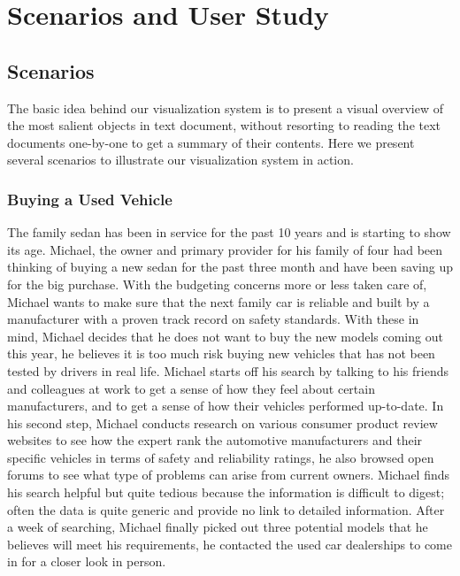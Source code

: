 
\chapter{Scenarios and User Study}

\section{Scenarios}
The basic idea behind our visualization system is to present a visual overview
of the most salient objects in text document, without resorting to reading the
text documents one-by-one to get a summary of their contents. Here we present
several scenarios to illustrate our visualization system in action.

\subsection{Buying a Used Vehicle}
The family sedan has been in service for the past 10 years and is starting to
show its age. Michael, the owner and primary provider for his family of four had 
been thinking of buying a new sedan for the past three month and have been saving 
up for the big purchase. With the budgeting concerns more or less taken care of, 
Michael wants to make sure that the next family car is reliable and built by a 
manufacturer with a proven track record on safety standards. With these in mind, 
Michael decides that he does not want to buy the new models coming out this year, 
he believes it is too much risk buying new vehicles that has not been tested by 
drivers in real life. Michael starts off his search by talking to his friends and 
colleagues at work to get a sense of how they feel about certain manufacturers, 
and to get a sense of how their vehicles performed up-to-date. In his second step, 
Michael conducts research on various consumer product review websites to see how 
the expert rank the automotive manufacturers and their specific vehicles in terms 
of safety and reliability ratings, he also browsed open forums to see what type of 
problems can arise from current owners. Michael finds his search helpful but quite 
tedious because the information is difficult to digest; often the data is quite 
generic and provide no link to detailed information. After a week of searching, 
Michael finally picked out three potential models that he believes will meet 
his requirements, he contacted the used car dealerships to come in for a closer 
look in person.

